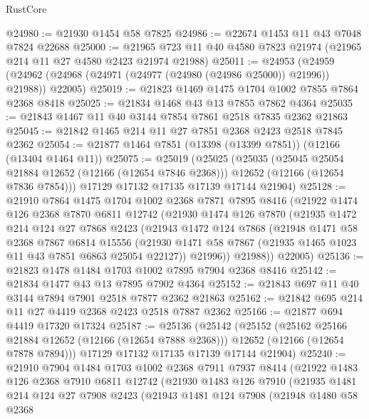 \begin{lexlean}{RustCore}
\begin{coremodule}
@24980 := @21930 @1454 @58 @7825
@24986 := @22674 @1453 @11 @43 @7048 @7824 @22688
@25000 := @21965 @723 @11 @40 @4580 @7823 @21974 (@21965 @214 @11 @27 @4580 @2423 @21974 @21988)
@25011 := @24953
    (@24959 (@24962 (@24968 (@24971 (@24977 (@24980 (@24986 @25000)) @21996)) @21988)) @22005)
@25019 := @21823 @1469 @1475 @1704 @1002 @7855 @7864 @2368 @8418
@25025 := @21834 @1468 @43 @13 @7855 @7862 @4364
@25035 := @21843 @1467 @11 @40 @3144 @7854 @7861 @2518 @7835 @2362 @21863
@25045 := @21842 @1465 @214 @11 @27 @7851 @2368 @2423 @2518 @7845 @2362
@25054 := @21877 @1464 @7851 (@13398 (@13399 @7851)) (@12166 (@13404 @1464 @11))
@25075 := @25019
    (@25025
      (@25035
        (@25045 @25054 @21884 @12652 (@12166 (@12654 @7846 @2368)))
        @12652
        (@12166 (@12654 @7836 @7854)))
      @17129
      @17132
      @17135
      @17139
      @17144
      @21904)
@25128 := @21910
    @7864
    @1475
    @1704
    @1002
    @2368
    @7871
    @7895
    @8416
    (@21922
      @1474
      @126
      @2368
      @7870
      @6811
      @12742
      (@21930
        @1474
        @126
        @7870
        (@21935
          @1472
          @214
          @124
          @27
          @7868
          @2423
          (@21943
            @1472
            @124
            @7868
            (@21948
              @1471
              @58
              @2368
              @7867
              @6814
              @15556
              (@21930 @1471 @58 @7867 (@21935 @1465 @1023 @11 @43 @7851 @6863 @25054 @22127))
              @21996))
          @21988))
      @22005)
@25136 := @21823 @1478 @1484 @1703 @1002 @7895 @7904 @2368 @8416
@25142 := @21834 @1477 @43 @13 @7895 @7902 @4364
@25152 := @21843 @697 @11 @40 @3144 @7894 @7901 @2518 @7877 @2362 @21863
@25162 := @21842 @695 @214 @11 @27 @4419 @2368 @2423 @2518 @7887 @2362
@25166 := @21877 @694 @4419 @17320 @17324
@25187 := @25136
    (@25142
      (@25152
        (@25162 @25166 @21884 @12652 (@12166 (@12654 @7888 @2368)))
        @12652
        (@12166 (@12654 @7878 @7894)))
      @17129
      @17132
      @17135
      @17139
      @17144
      @21904)
@25240 := @21910
    @7904
    @1484
    @1703
    @1002
    @2368
    @7911
    @7937
    @8414
    (@21922
      @1483
      @126
      @2368
      @7910
      @6811
      @12742
      (@21930
        @1483
        @126
        @7910
        (@21935
          @1481
          @214
          @124
          @27
          @7908
          @2423
          (@21943
            @1481
            @124
            @7908
            (@21948
              @1480
              @58
              @2368

\end{coremodule}
\end{lexlean}
